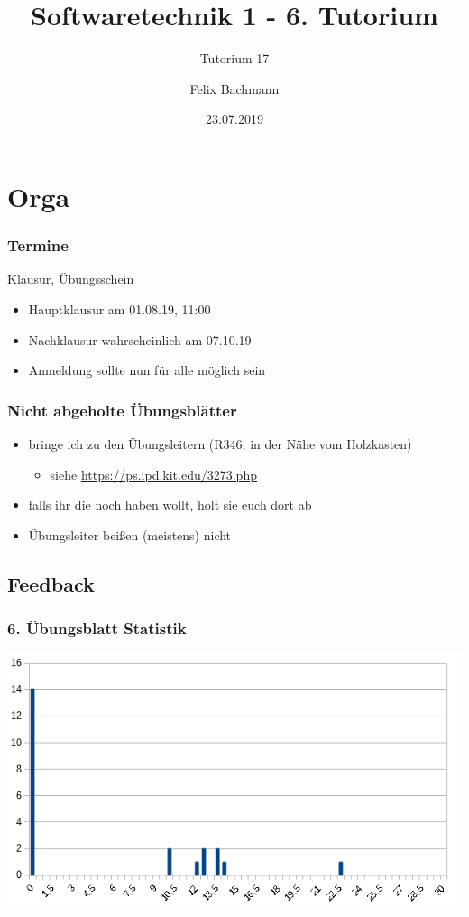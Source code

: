 \documentclass[18pt]{beamer}
\title[SWT1]{Softwaretechnik 1 - 6. Tutorium}
\subtitle{Tutorium 17}
\author{Felix Bachmann}
\date{23.07.2019}
\institute{KIT - Institut für Programmstrukturen und Datenorganisation (IPD)}
\begin{document}
	
\setcounter{tocdepth}{2}
	
\begin{frame}
\titlepage
\end{frame}

\begin{frame}
\tableofcontents
\end{frame}


\section{Orga}
	\begin{frame}
		\frametitle{Termine}
		\begin{block}{Klausur, Übungsschein}
			\begin{itemize}
				\item Hauptklausur am 01.08.19, 11:00
				\item Nachklausur wahrscheinlich am 07.10.19
				\item Anmeldung sollte nun für alle möglich sein
			\end{itemize}
		\end{block}
	\end{frame}

	\begin{frame}
		\frametitle{Nicht abgeholte Übungsblätter}
		\begin{itemize}
			\item bringe ich zu den Übungsleitern (R346, in der Nähe vom Holzkasten)
			\begin{itemize}
				\item siehe \url{https://ps.ipd.kit.edu/3273.php}
			\end{itemize}
			\item falls ihr die noch haben wollt, holt sie euch dort ab
			\item Übungsleiter beißen (meistens) nicht
		\end{itemize}
	\end{frame}

	\subsection{Feedback}
	\begin{frame}
		\frametitle{6. Übungsblatt Statistik}
		\includegraphics[scale=0.7]{./pics/tut6/statistics-ub6.png}
	\end{frame}
\end{document}
